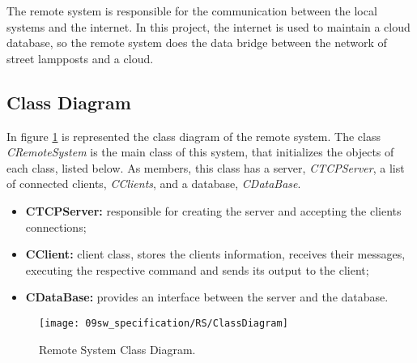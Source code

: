 The remote system is responsible for the communication between the local systems and the internet. In this project, the internet is used to maintain a cloud database, so the remote system does the data bridge between the network of street lampposts and a cloud. 



\subsection{Class Diagram}
In figure \ref{fig:rs_classDiag} is represented the class diagram of the remote system. The class \textit{CRemoteSystem} is the main class of this system, that initializes the objects of each class, listed below. As members, this class has a server, \textit{CTCPServer}, a list of connected clients, \textit{CClients}, and a database, \textit{CDataBase}. 

\begin{itemize}
	\item \textbf{CTCPServer:} responsible for creating the server and accepting the clients connections;
	\item \textbf{CClient:} client class, stores the clients information, receives their messages, executing the respective command and sends its output to the client;
	\item \textbf{CDataBase:} provides an interface between the server and the database.
\end{itemize}

\begin{figure}[H]
	\centering
	\texttt{[image: 09sw\_specification/RS/ClassDiagram]}
	\caption{Remote System Class Diagram.}
	\label{fig:rs_classDiag}
\end{figure}


